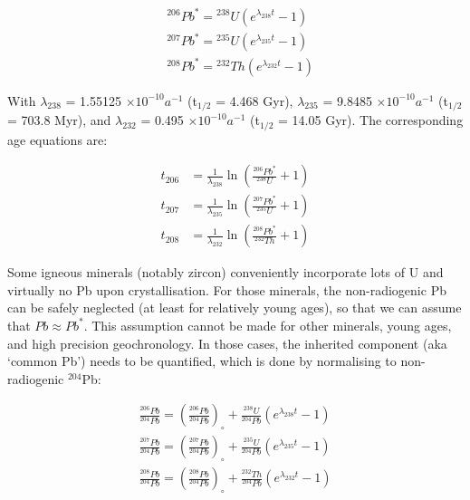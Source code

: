 \begin{equation}
  \begin{array}{rl}
    &{}^{206}Pb^* = {}^{238}U \left(e^{\lambda_{238}t} - 1\right)\\ 
    &{}^{207}Pb^* = {}^{235}U \left(e^{\lambda_{235}t} - 1\right)\\ 
    &{}^{208}Pb^* = {}^{232}Th \left(e^{\lambda_{232}t} - 1\right)
  \end{array}
  \label{eq:Pb*}
\end{equation}

With $\lambda_{238}$ = 1.55125 $\times 10^{-10} a^{-1}$ (t$_{1/2}$ =
4.468 Gyr), $\lambda_{235}$ = 9.8485 $\times 10^{-10} a^{-1}$
(t$_{1/2}$ = 703.8 Myr), and $\lambda_{232}$ = 0.495 $\times 10^{-10}
a^{-1}$ (t$_{1/2}$ = 14.05 Gyr). The corresponding age equations are:

\begin{equation}
  \begin{array}{rl}
    t_{206} & = \frac{1}{\lambda_{238}}
    \ln \left(\frac{{}^{206}Pb^*}{{}^{238}U}+1\right)\\
    t_{207} & = \frac{1}{\lambda_{235}}
    \ln \left(\frac{{}^{207}Pb^*}{{}^{235}U}+1\right)\\
    t_{208} & = \frac{1}{\lambda_{232}}
    \ln \left(\frac{{}^{208}Pb^*}{{}^{232}Th}+1\right)
  \end{array}
  \label{eq:tPb*}
\end{equation}

Some igneous minerals (notably zircon) conveniently incorporate lots
of U and virtually no Pb upon crystallisation. For those minerals, the
non-radiogenic Pb can be safely neglected (at least for relatively
young ages), so that we can assume that $Pb \approx Pb^*$. This
assumption cannot be made for other minerals, young ages, and high
precision geochronology. In those cases, the inherited component (aka
`common Pb') needs to be quantified, which is done by normalising to
non-radiogenic $^{204}$Pb:

\begin{equation}
\begin{array}{c}
  \frac{^{206}Pb}{^{204}Pb} = \left(\frac{^{206}Pb}{^{204}Pb}\right)_\circ +
  \frac{^{238}U}{^{204}Pb} \left(e^{\lambda_{238}t} - 1\right) \\
  \frac{^{207}Pb}{^{204}Pb} = \left(\frac{^{207}Pb}{^{204}Pb}\right)_\circ +
  \frac{^{235}U}{^{204}Pb} \left(e^{\lambda_{235}t} - 1\right)\\
  \frac{^{208}Pb}{^{204}Pb} = \left(\frac{^{208}Pb}{^{204}Pb}\right)_\circ +
  \frac{^{232}Th}{^{204}Pb} \left(e^{\lambda_{232}t} - 1\right)
\end{array}
\label{eq:Pb}
\end{equation}

